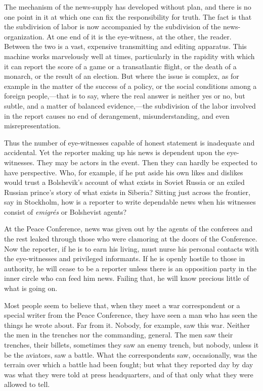 \documentclass[openany,nobib,nohyper]{tufte-book}
\begin{document}
The mechanism of the news-supply has developed without plan, and there
is no one point in it at which one can fix the responsibility for truth.
The fact is that the subdivision of labor is now accompanied by the
subdivision of the news-organization. At one end of it is the
eye-witness, at the other, the reader. Between the two is a vast,
expensive transmitting and editing apparatus. This machine works
marvelously well at times, particularly in the rapidity with which it
can report the score of a game or a transatlantic flight, or the death
of a monarch, or the result of an election. But where the issue is
complex, as for example in the matter of the success of a policy, or the
social conditions among a foreign people,---that is to say, where the
real answer is neither yes or no, but subtle, and a matter of balanced
evidence,---the subdivision of the labor involved in the report causes
no end of derangement, misunderstanding, and even misrepresentation.

Thus the number of eye-witnesses capable of honest statement is
inadequate and accidental. Yet the reporter making up his news is
dependent upon the eye-witnesses. They may be actors in the event. Then
they can hardly be expected to have perspective. Who, for example, if he
put aside his own likes and dislikes would trust a Bolshevik's account
of what exists in Soviet Russia or an exiled Russian prince's story of
what exists in Siberia? Sitting just across the frontier, say in
Stockholm, how is a reporter to write dependable news when his witnesses
consist of \emph{emigrés} or Bolshevist agents?

At the Peace Conference, news was given out by the agents of the
conferees and the rest leaked through those who were clamoring at the
doors of the Conference. Now the reporter, if he is to earn his living,
must nurse his personal contacts with the eye-witnesses and privileged
informants. If he is openly hostile to those in authority, he will cease
to be a reporter unless there is an opposition party in the inner circle
who can feed him news. Failing that, he will know precious little of
what is going on.

Most people seem to believe that, when they meet a war correspondent or
a special writer from the Peace Conference, they have seen a man who has
seen the things he wrote about. Far from it. Nobody, for example, saw
this war. Neither the men in the trenches nor the commanding, general.
The men saw their trenches, their billets, sometimes they saw an enemy
trench, but nobody, unless it be the aviators, saw a battle. What the
correspondents saw, occasionally, was the terrain over which a battle
had been fought; but what they reported day by day was what they were
told at press headquarters, and of that only what they were allowed to
tell.
\end{document}
